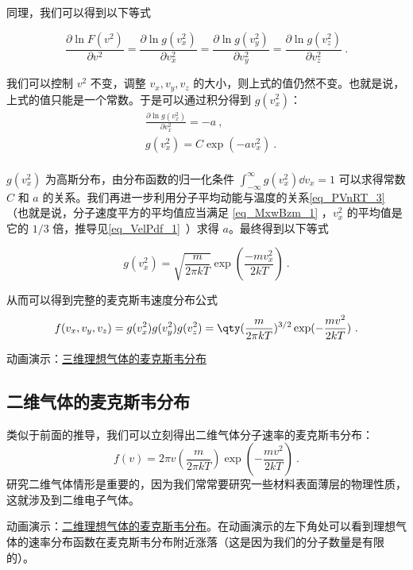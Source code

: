 同理，我们可以得到以下等式

\begin{equation}
\frac{\partial \ln F(v^2)}{\partial v^2}=\frac{\partial \ln g(v_x^2)}{\partial v_x^2}=\frac{\partial \ln g(v_y^2)}{\partial v_y^2}=\frac{\partial \ln g(v_z^2)}{\partial v_z^2}~.
\end{equation}

我们可以控制 $v^2$ 不变，调整 $v_x,v_y,v_z$ 的大小，则上式的值仍然不变。也就是说，上式的值只能是一个常数。于是可以通过积分得到 $g(v_x^2)$：
\begin{equation}
\begin{aligned}
&\frac{\partial \ln g(v_x^2)}{\partial v_x^2} = -a~,\\
&g(v_x^2)=C\exp(-av_x^2)~.\\
\end{aligned}
\end{equation}

$g(v_x^2)$ 为高斯分布，由分布函数的归一化条件 $\int_{-\infty}^\infty g(v_x^2)\dd v_x=1$ 可以求得常数 $C$ 和 $a$ 的关系。我们再进一步利用分子平均动能与温度的关系\autoref{eq_PVnRT_3}~ （也就是说，分子速度平方的平均值应当满足 \autoref{eq_MxwBzm_1} ，$v_x^2$ 的平均值是它的 $1/3$ 倍，推导见\autoref{eq_VelPdf_1}~）求得 $a$。最终得到以下等式

\begin{equation}
g(v_x^2)=\sqrt{\frac{m}{2\pi kT}}\exp(\frac{-mv_x^2}{2kT})~.
\end{equation}

从而可以得到完整的麦克斯韦速度分布公式
\begin{equation}
f(v_x,v_y,v_z)=g(v_x^2)g(v_y^2)g(v_z^2)=\qty(\frac{m}{2\pi k T})^{3/2}\exp(-\frac{mv^2}{2kT})~.
\end{equation}

动画演示：\href{https://wuli.wiki/apps/Maxwell3D/physics.html}{三维理想气体的麦克斯韦分布}

\subsection{二维气体的麦克斯韦分布}
类似于前面的推导，我们可以立刻得出二维气体分子速率的麦克斯韦分布：
\begin{equation}
f(v)=2\pi v\left(\frac{m}{2\pi kT}\right)\exp\left(-\frac{m v^2}{2kT}\right)~.
\end{equation}
研究二维气体情形是重要的，因为我们常常要研究一些材料表面薄层的物理性质，这就涉及到二维电子气体。

动画演示：\href{https://wuli.wiki/apps/Maxwell2D/physics.html}{二维理想气体的麦克斯韦分布}。在动画演示的左下角处可以看到理想气体的速率分布函数在麦克斯韦分布附近涨落（这是因为我们的分子数量是有限的）。